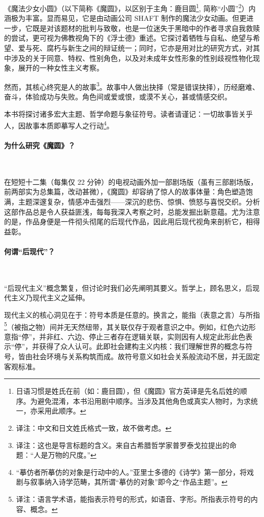 《魔法少女小圆》（以下简称《魔圆》，以区别于主角：鹿目圆\footnote{日语习惯是姓氏在前（如：鹿目圆），但《魔圆》官方英译是先名后姓的顺序。为避免混淆，本书沿用剧中顺序。当涉及其他角色或真实人物时，为求统一，亦采用此顺序。}, 简称“小圆”\footnote{译注：中文和日文姓氏格式一致，故不做考虑。}）内涵极为丰富。显而易见，它是由动画公司 SHAFT 制作的魔法少女动画。但更进一步，它既是对该题材的批判与致敬，也是一位迷失于黑暗中的作者寻求自我救赎的尝试，更可视为佛教视角下的《浮士德》重述。它探讨着牺牲与自私、绝望与希望、爱与死、腐朽与新生之间的辩证统一；同时，它亦是用对比的研究方式，对其中涉及的关于同意、特权、性别角色，以及对未成年女性形象的性别歧视性物化现象，展开的一种女性主义考察。

然而，其核心终究是人的故事\footnote{译注：这也是导言标题的含义。来自古希腊哲学家普罗泰戈拉提出的命题：“人是万物的尺度。”}。故事中人做出抉择（常是错误抉择），历经磨难、奋斗，体验成功与失败。角色间或爱或恨，或漠不关心，甚或情感交织。

本书将探讨诸多宏大主题、哲学命题与象征符号。读者请谨记：一切故事皆关乎人，因故事本质即摹写人之行动\footnote{ “摹仿者所摹仿的对象是行动中的人。”亚里士多德的《诗学》第一部分，将戏剧与叙事纳入诗学范畴，其所谓“摹仿的对象”即今之“作品主题”。}\cite{ref1}。 
\paragraph{为什么研究《魔圆》？}~{}

在短短十二集（每集仅 22 分钟）的电视动画外加一部剧场版（虽有三部剧场版，前两部实为总集篇，改动甚微），《魔圆》却容纳了惊人的故事体量：角色塑造饱满，主题深邃复杂，情感冲击强烈——深沉的悲伤、惊惧、愤怒与喜悦交织。分析这部作品总是令人获益匪浅，每每我深入考察之时，总能发掘出新意蕴。尤为注意的是，作品身便是一件彻头彻尾的后现代作品，因此用后现代视角来剖析它，相得益彰。
\paragraph{何谓“后现代”？}~{}

“后现代主义”概念繁复，但讨论时我们必先阐明其要义。哲学上，顾名思义，后现代主义乃现代主义之延伸。

现代主义的核心洞见在于：符号本质是任意的。换言之，能指（表意之言）与所指\footnote{译注：语言学术语，能指表示符号的形式，如语音、字形。所指表示符号的内容、概念。}（被指之物）间并无天然纽带，其关联仅存于观者意识之中。例如，红色六边形意指“停”，并非红、六边、停止三者存在逻辑关联，实则因有人规定此形此色表示“停”，并获得了众人认可。此即社会建构主义内核：我们理解世界的概念与符号，皆由社会环境与关系构筑而成。故符号意义如社会关系般流动不居，并无固定客观标准\cite{ref2}。

